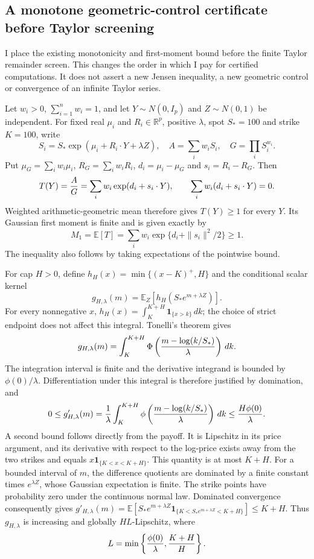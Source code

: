 \subsection{A monotone geometric-control certificate before Taylor screening}
\label{sec:monotone-before-taylor}

I place the existing monotonicity and first-moment bound before the finite
Taylor remainder screen. This changes the order in which I pay for certified
computations. It does not assert a new Jensen inequality, a new geometric
control or convergence of an infinite Taylor series.

Let $w_i>0$, $\sum_{i=1}^n w_i=1$, and let $Y\sim N(0,I_p)$ and
$Z\sim N(0,1)$ be independent. For fixed real $\mu_i$ and $R_i\in\mathbb R^p$,
positive $\lambda$, spot $S_*=100$ and strike $K=100$, write
\[
 S_i=S_*\exp(\mu_i+R_i\cdot Y+\lambda Z),\quad
 A=\sum_iw_iS_i,\quad G=\prod_iS_i^{w_i}.
\]
Put $\mu_G=\sum_iw_i\mu_i$, $R_G=\sum_iw_iR_i$,
$d_i=\mu_i-\mu_G$ and $s_i=R_i-R_G$. Then
\[
 T(Y)={A\over G}=\sum_iw_i\exp(d_i+s_i\cdot Y),
 \qquad \sum_iw_i(d_i+s_i\cdot Y)=0.
\]
Weighted arithmetic-geometric mean therefore gives $T(Y)\geq1$ for every
$Y$. Its Gaussian first moment is finite and is given exactly by
\begin{equation}
 M_1=\mathbb E[T]=\sum_iw_i\exp\{d_i+\|s_i\|^2/2\}\geq1.
 \label{eq:hierarchy-ratio-first-moment}
\end{equation}
The inequality also follows by taking expectations of the pointwise bound.

For cap $H>0$, define $h_H(x)=\min\{(x-K)^+,H\}$ and the conditional scalar
kernel
\[
 g_{H,\lambda}(m)=\mathbb E_Z[h_H(S_*e^{m+\lambda Z})].
\]
For every nonnegative $x$,
$h_H(x)=\int_K^{K+H}\mathbf1_{\{x>k\}}\,dk$; the choice of strict endpoint
does not affect this integral. Tonelli's theorem gives
\[
 g_{H,\lambda}(m)=\int_K^{K+H}
 \Phi\left({m-\log(k/S_*)\over\lambda}\right)\,dk.
\]
The integration interval is finite and the derivative integrand is bounded
by $\phi(0)/\lambda$. Differentiation under this integral is therefore
justified by domination, and
\[
 0\leq g'_{H,\lambda}(m)
 ={1\over\lambda}\int_K^{K+H}
 \phi\left({m-\log(k/S_*)\over\lambda}\right)\,dk
 \leq {H\phi(0)\over\lambda}.
\]
A second bound follows directly from the payoff. It is Lipschitz in its
price argument, and its derivative with respect to the log-price exists
away from the two strikes and equals
$x\mathbf1_{\{K<x<K+H\}}$. This quantity is at most $K+H$. For a bounded
interval of $m$, the difference quotients are dominated by a finite
constant times $e^{\lambda Z}$, whose Gaussian expectation is finite.
The strike points have probability zero under the continuous normal law.
Dominated convergence consequently gives
$g'_{H,\lambda}(m)=\mathbb E[S_*e^{m+\lambda Z}
\mathbf1_{\{K<S_*e^{m+\lambda Z}<K+H\}}]\leq K+H$.
Thus $g_{H,\lambda}$ is increasing and globally $H L$-Lipschitz, where
\begin{equation}
 L=\min\left\{{\phi(0)\over\lambda},{K+H\over H}\right\}.
 \label{eq:hierarchy-log-lipschitz}
\end{equation}

